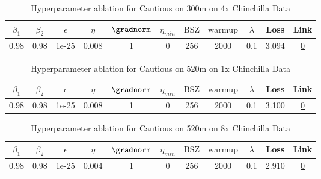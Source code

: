 \begin{table}[H]
\centering
\caption{Hyperparameter ablation for Cautious on 300m on 4x Chinchilla Data}
\label{tab:ablation_cautious_300m_4}
\begin{tabular}{ccccccccccc}
\toprule
$\beta_1$ & $\beta_2$ & $\epsilon$ & $\eta$ & $\gradnorm$ & $\eta_{min}$ & $\mathrm{BSZ}$ & $\mathrm{warmup}$ & $\lambda$ & Loss & Link \\
\midrule
0.98 & 0.98 & 1e-25 & 0.008 & 1 & 0 & 256 & 2000 & 0.1 & 3.094 & \href{https://wandb.ai/stanford-mercury/optimizer-scaling/runs/sweep-300m-24B-cautious820e4dlr0.008-wd0.1-minlr0-warmup2000-b10-fe0a65}{0} \\
\midrule
\bottomrule
\end{tabular}
\end{table}

\begin{table}[H]
\centering
\caption{Hyperparameter ablation for Cautious on 520m on 1x Chinchilla Data}
\label{tab:ablation_cautious_520m_1}
\begin{tabular}{ccccccccccc}
\toprule
$\beta_1$ & $\beta_2$ & $\epsilon$ & $\eta$ & $\gradnorm$ & $\eta_{min}$ & $\mathrm{BSZ}$ & $\mathrm{warmup}$ & $\lambda$ & Loss & Link \\
\midrule
0.98 & 0.98 & 1e-25 & 0.008 & 1 & 0 & 256 & 2000 & 0.1 & 3.100 & \href{https://wandb.ai/stanford-mercury/optimizer-scaling/runs/sweep-520m-10B-cautiouscda486lr0.008-wd0.1-minlr0-warmup2000-b10-1d8924}{0} \\
\midrule
\bottomrule
\end{tabular}
\end{table}

\begin{table}[H]
\centering
\caption{Hyperparameter ablation for Cautious on 520m on 8x Chinchilla Data}
\label{tab:ablation_cautious_520m_8}
\begin{tabular}{ccccccccccc}
\toprule
$\beta_1$ & $\beta_2$ & $\epsilon$ & $\eta$ & $\gradnorm$ & $\eta_{min}$ & $\mathrm{BSZ}$ & $\mathrm{warmup}$ & $\lambda$ & Loss & Link \\
\midrule
0.98 & 0.98 & 1e-25 & 0.004 & 1 & 0 & 256 & 2000 & 0.1 & 2.910 & \href{https://wandb.ai/stanford-mercury/optimizer-scaling/runs/sweep-520m-85B-cautious66b1b7lr0.004-wd0.1-minlr0-warmup2000-b10-d99a40}{0} \\
\midrule
\bottomrule
\end{tabular}
\end{table}


